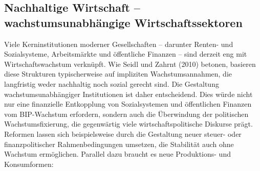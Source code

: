 \documentclass[
  nswissgerman,
  a4paper,
  DIV=11,
  numbers=noendperiod,
  oneside,
  openany]{scrreprt}
\begin{document}
\subsection{Nachhaltige Wirtschaft -- wachstumsunabhängige
Wirtschaftssektoren}\label{nachhaltige-wirtschaft-wachstumsunabhuxe4ngige-wirtschaftssektoren}

Viele Kerninstitutionen moderner Gesellschaften -- darunter Renten- und
Sozialsysteme, Arbeitsmärkte und öffentliche Finanzen -- sind derzeit
eng mit Wirtschaftswachstum verknüpft. Wie Seidl und Zahrnt (2010)
betonen, basieren diese Strukturen typischerweise auf impliziten
Wachstumsannahmen, die langfristig weder nachhaltig noch sozial gerecht
sind. Die Gestaltung wachstumsunabhängiger Institutionen ist daher
entscheidend. Dies würde nicht nur eine finanzielle Entkopplung von
Sozialsystemen und öffentlichen Finanzen vom BIP-Wachstum erfordern,
sondern auch die Überwindung der politischen Wachstumsfixierung, die
gegenwärtig viele wirtschaftspolitische Diskurse prägt. Reformen lassen
sich beispielsweise durch die Gestaltung neuer steuer- oder
finanzpolitischer Rahmenbedingungen umsetzen, die Stabilität auch ohne
Wachstum ermöglichen. Parallel dazu braucht es neue Produktions- und
Konsumformen:
\end{document}
